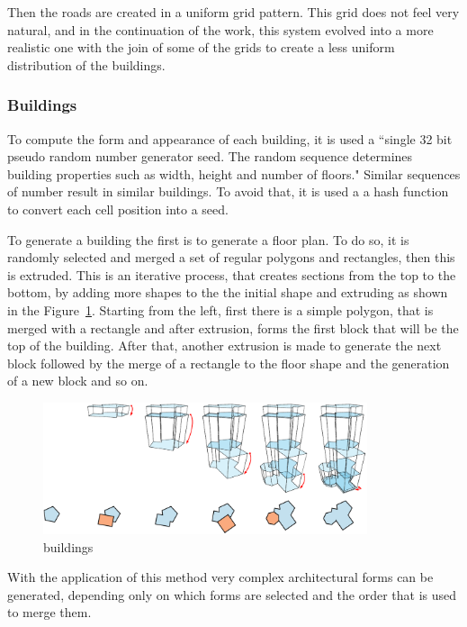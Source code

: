 Then the roads are created in a uniform grid pattern. This grid does not feel very natural, and in the continuation of the work, this system evolved into a more realistic one with the join of some of the grids to create a less uniform distribution of the buildings.


\subsubsection{Buildings} %
\label{ssub:buildings}


To compute the form and appearance of each building, it is used a ``single 32 bit pseudo random number generator seed. The random sequence determines building properties such as width, height and number of floors."
Similar sequences of number result in similar buildings. To avoid that, it is used a a hash function to convert each cell position into a seed.

To generate a building the first is to generate a floor plan. To do so, it is randomly selected and merged a set of regular polygons and rectangles, then this is extruded. This is an iterative process, that creates sections from the top to the bottom, by adding more shapes to the the initial shape and extruding as shown in the Figure~\ref{fig:UC_buildings}. Starting from the left, first there is a simple polygon, that is merged with a rectangle and after extrusion, forms the first block that will be the top of the building. After that, another extrusion is made to generate the next block followed by the merge of a rectangle to the floor shape and the generation of a new block and so on.

\begin{figure}[htbp]
	\centering
	\includegraphics[width=0.85\textwidth]{img/Real-Time-procedural-generation/Building-Generation.png}
	\caption{buildings}
	\label{fig:UC_buildings}
\end{figure}

With the application of this method very complex architectural forms can be generated, depending only on which forms are selected and the order that is used to merge them.


